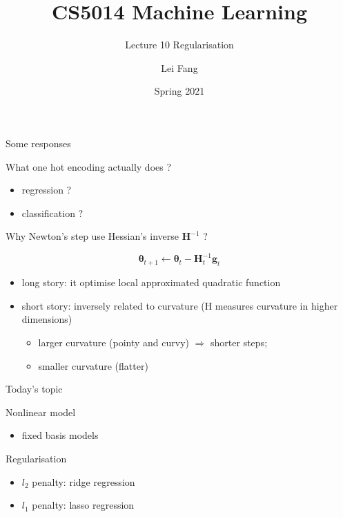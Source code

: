 \documentclass[ignorenonframetext,aspectratio=169]{beamer}
\title{CS5014 Machine Learning}
\subtitle{Lecture 10 Regularisation}
\author{Lei Fang}
\date{Spring 2021}
\providecommand{\tightlist}{%
  \setlength{\itemsep}{0pt}\setlength{\parskip}{0pt}}
\newcommand{\vv}[1]{\boldsymbol{#1}}
\begin{document}
\frame{\titlepage}

\begin{frame}{Some responses}
\protect\hypertarget{some-responses}{}

What one hot encoding actually does ?

\begin{itemize}
\tightlist
\item
  regression ?
\item
  classification ?
\end{itemize}

\bigskip

Why Newton's step use Hessian's inverse \(\vv{H}^{-1}\) ?

\[\vv{\theta}_{t+1} \leftarrow \vv{\theta}_t - \vv{H}_t^{-1}\vv{g}_t\]

\begin{itemize}
\item
  long story: it optimise local approximated quadratic function
\item
  short story: inversely related to curvature (H measures curvature in
  higher dimensions)

  \begin{itemize}
  \tightlist
  \item
    larger curvature (pointy and curvy) \(\Rightarrow\) shorter steps;
  \item
    smaller curvature (flatter)
  \end{itemize}
\end{itemize}

\end{frame}

\begin{frame}{Today's topic}
\protect\hypertarget{todays-topic}{}

Nonlinear model

\begin{itemize}
\tightlist
\item
  fixed basis models
\end{itemize}

Regularisation

\begin{itemize}
\tightlist
\item
  \(l_2\) penalty: ridge regression
\item
  \(l_1\) penalty: lasso regression
\end{itemize}

\end{frame}
\end{document}
